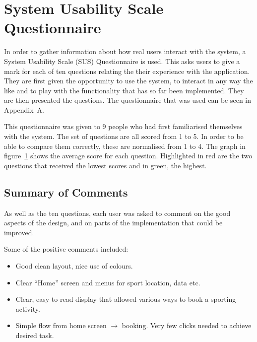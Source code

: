 \section{System Usability Scale Questionnaire}
\label{sec:system_usability_scale_questionnaire}

In order to gather information about how real users interact with the system, a
System Usability Scale (SUS) Questionnaire is used. This asks users to give a
mark for each of ten questions relating the their experience with the
application. They are first given the opportunity to use the system, to
interact in any way the like and to play with the functionality that has so far
been implemented. They are then presented the questions. The questionnaire that
was used can be seen in Appendix~A.

This questionnaire was given to 9 people who had first familiarised themselves
with the system. The set of questions are all scored from 1 to 5. In order to
be able to compare them correctly, these are normalised from 1 to 4. The graph
in figure~\ref{fig:evalGraph} shows the average score for each question.
Highlighted in red are the two questions that received the lowest scores and in
green, the highest.

\begin{figure}[h]
\centering

\caption{}\label{fig:evalGraph}
\end{figure}

\subsection{Summary of Comments}
\label{sub:summary_of_comments}

As well as the ten questions, each user was asked to comment on the good
aspects of the design, and on parts of the implementation that could be
improved.

Some of the positive comments included:
\begin{itemize}
	\item Good clean layout, nice use of colours.
	\item Clear ``Home'' screen and menus for sport location, data etc.
	\item Clear, easy to read display that allowed various ways to book a
		sporting activity.
	\item Simple flow from home screen $\rightarrow$ booking. Very few clicks
		needed to achieve desired task.
\end{itemize}

